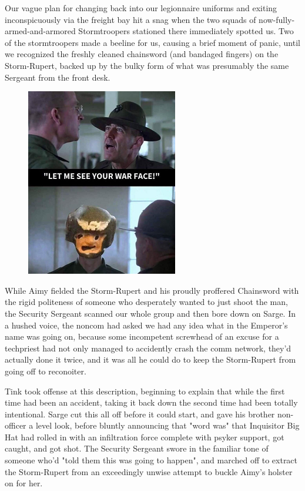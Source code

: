 Our vague plan for changing back into our legionnaire uniforms and exiting inconspicuously via the freight bay hit a snag when the two squads of now-fully-armed-and-armored Stormtroopers stationed there immediately spotted us. 
Two of the stormtroopers made a beeline for us, causing a brief moment of panic, until we recognized the freshly cleaned chainsword (and bandaged fingers) on the Storm-Rupert, backed up by the bulky form of what was presumably the same Sergeant from the front desk. 


\begin{figure}
	\begin{center}
		\includegraphics[width=\figwidth]{pics/21/114.png}
	\end{center}
\end{figure}
While Aimy fielded the Storm-Rupert and his proudly proffered Chainsword with the rigid politeness of someone who desperately wanted to just shoot the man, the Security Sergeant scanned our whole group and then bore down on Sarge. 
In a hushed voice, the noncom had asked we had any idea what in the Emperor's name was going on, because some incompetent screwhead of an excuse for a techpriest had not only managed to accidently crash the comm network, they'd actually done it twice, and it was all he could do to keep the Storm-Rupert from going off to reconoiter. 


Tink took offense at this description, beginning to explain that while the first time had been an accident, taking it back down the second time had been totally intentional. 
Sarge cut this all off before it could start, and gave his brother non-officer a level look, before bluntly announcing that "word was" that Inquisitor Big Hat had rolled in with an infiltration force complete with psyker support, got caught, and got shot. 
The Security Sergeant swore in the familiar tone of someone who'd "told them this was going to happen", and marched off to extract the Storm-Rupert from an exceedingly unwise attempt to buckle Aimy's holster on for her.

